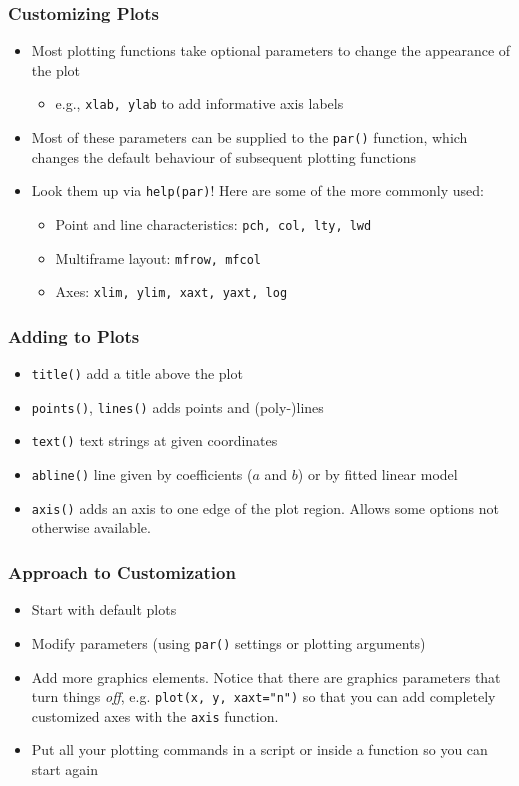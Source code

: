 \documentclass[xcolor=svgnames]{beamer}
\newcommand{\code}[1]{\texttt{#1}}
\begin{document}
\begin{frame}
  \frametitle{Customizing Plots}
  \begin{itemize}
  \item Most plotting functions take optional parameters to change the
    appearance of the plot
    \begin{itemize}
    \item e.g., \code{xlab, ylab} to add informative axis labels
    \end{itemize}
  \item Most of these parameters can be supplied to the \code{par()}
    function, which changes the default behaviour of subsequent
    plotting functions
  \item Look them up via \code{help(par)}! Here are some of the more
    commonly used:
    \begin{itemize}
    \item Point and line characteristics: \code{pch, col, lty, lwd}
    \item Multiframe layout: \code{mfrow, mfcol}
    \item Axes: \code{xlim, ylim, xaxt, yaxt, log}
    \end{itemize}
  \end{itemize}
\end{frame}

\begin{frame}
  \frametitle{Adding to Plots}
    \begin{itemize}
    \item \code{title()} add a title above the plot
    \item \code{points()}, \code{lines()} adds points and (poly-)lines
    \item \code{text()} text strings at given coordinates
    \item \code{abline()} line given by coefficients ($a$ and $b$) or
      by fitted linear model
    \item \code{axis()} adds an axis to one edge of the plot region.
      Allows some options not otherwise available.
    \end{itemize}
\end{frame}

\begin{frame}
  \frametitle{Approach to Customization}
  \begin{itemize}
  \item Start with default plots
  \item Modify parameters (using \code{par()} settings or plotting
      arguments)
  \item Add more graphics elements. Notice that there are graphics
      parameters that turn things \emph{off}, e.g.
      \code{plot(x, y, xaxt="n")} so that you can add
      completely customized axes with the \code{axis} function.
  \item Put all your plotting commands in a script or inside a function
      so you can start again
  \end{itemize}
\end{frame}
\end{document}
